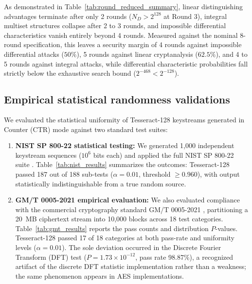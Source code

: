 \documentclass[10pt,twocolumn]{article}
\begin{document}
As demonstrated in Table~\ref{tab:round_reduced_summary}, linear distinguishing advantages terminate after only 2 rounds ($N_D > 2^{128}$ at Round 3), integral multiset structures collapse after 2 to 3 rounds, and impossible differential characteristics vanish entirely beyond 4 rounds. Measured against the nominal 8-round specification, this leaves a security margin of 4 rounds against impossible differential attacks ($50\%$), 5 rounds against linear cryptanalysis ($62.5\%$), and 4 to 5 rounds against integral attacks, while differential characteristic probabilities fall strictly below the exhaustive search bound ($2^{-468} < 2^{-128}$).

\subsection{Empirical statistical randomness validations}
We evaluated the statistical uniformity of Tesseract-128 keystreams generated in Counter (CTR) mode against two standard test suites:

\begin{enumerate}
\setlength{\itemsep}{1pt}
\setlength{\parsep}{0pt}
\setlength{\parskip}{0pt}
    \item \textbf{NIST SP 800-22 statistical testing:} We generated 1,000 independent keystream sequences ($10^6$ bits each) and applied the full NIST SP 800-22 suite \cite{rukhin2010nist}. Table~\ref{tab:nist_results} summarizes the outcomes: Tesseract-128 passed 187 out of 188 sub-tests ($\alpha = 0.01$, threshold $\ge 0.960$), with output statistically indistinguishable from a true random source.
    \item \textbf{GM/T 0005-2021 empirical evaluation:} We also evaluated compliance with the commercial cryptography standard GM/T 0005-2021 \cite{gmt0005}, partitioning a 20~MB ciphertext stream into 10,000 blocks across 18 test categories. Table~\ref{tab:gmt_results} reports the pass counts and distribution $P$-values. Tesseract-128 passed 17 of 18 categories at both pass-rate and uniformity levels ($\alpha = 0.01$). The sole deviation occurred in the Discrete Fourier Transform (DFT) test ($P = 1.73 \times 10^{-12}$, pass rate 98.87\%), a recognized artifact of the discrete DFT statistic implementation \cite{kim2004dft} rather than a weakness; the same phenomenon appears in AES implementations.
\end{enumerate}
\end{document}
